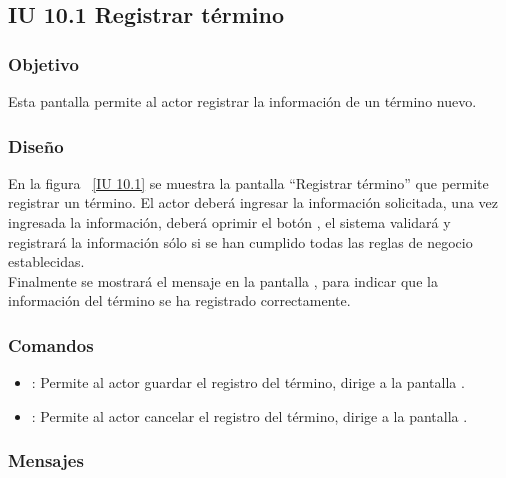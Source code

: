 \newpage 
\subsection{IU 10.1 Registrar término}

\subsubsection{Objetivo}
	
	Esta pantalla permite al actor registrar la información de un término nuevo.

\subsubsection{Diseño}

    En la figura ~\ref{IU 10.1} se muestra la pantalla ``Registrar término'' que permite registrar un término. El actor deberá ingresar la información solicitada, 
    una vez ingresada la información, deberá oprimir el botón 
    , el sistema validará y registrará la información sólo si se han cumplido todas las reglas de negocio establecidas.  \\
    
    Finalmente se mostrará el mensaje  en la pantalla , para indicar que la información del término
    se ha registrado correctamente.  \\      



\subsubsection{Comandos}
\begin{itemize}
	\item {}: Permite al actor guardar el registro del término, dirige a la pantalla .
	\item {}: Permite al actor cancelar el registro del término, dirige a la pantalla .
\end{itemize}

\subsubsection{Mensajes}

